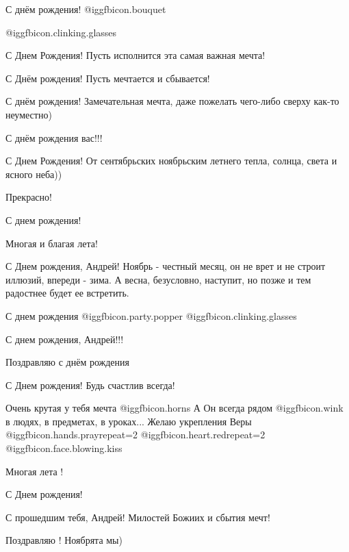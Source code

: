 \begin{itemize}
С днём рождения! @igg{fbicon.bouquet} 

 @igg{fbicon.clinking.glasses} 

С Днем Рождения! Пусть исполнится эта самая важная мечта!

С Днём рождения! Пусть мечтается и сбывается!

С днём рождения! Замечательная мечта, даже пожелать чего-либо сверху как-то неуместно)

С днём рождения вас!!!

С Днем Рождения! От сентябрьских ноябрьским летнего тепла, солнца, света и ясного неба))

Прекрасно!

С днем рождения!


Многая и благая лета!


С Днем рождения, Андрей! Ноябрь - честный месяц, он не врет и не строит
иллюзий, впереди - зима. А весна, безусловно, наступит, но позже и тем
радостнее будет ее встретить.

С днем рождения @igg{fbicon.party.popper}  @igg{fbicon.clinking.glasses} 

С днем рождения, Андрей!!!

Поздравляю с днём рождения


С Днем рождения! Будь счастлив всегда!

Очень крутая у тебя мечта  @igg{fbicon.horns}  А Он всегда рядом  @igg{fbicon.wink}  в людях, в предметах, в
уроках...  Желаю укрепления Веры  @igg{fbicon.hands.pray}{repeat=2} @igg{fbicon.heart.red}{repeat=2}  @igg{fbicon.face.blowing.kiss} 

Многая лета !

С Днем рождения!

С прошедшим тебя, Андрей! Милостей Божиих и сбытия мечт!

Поздравляю ! Ноябрята мы)

\end{itemize} %
